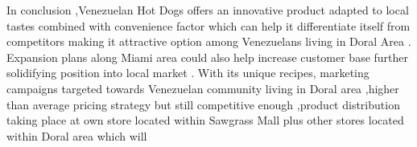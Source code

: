 In conclusion ,Venezuelan Hot Dogs offers an innovative product adapted to local tastes combined with convenience factor which can help it differentiate itself from competitors making it attractive option among Venezuelans living in Doral Area . Expansion plans along Miami area could also help increase customer base further solidifying position into local market . With its unique recipes, marketing campaigns targeted towards Venezuelan community living in Doral area ,higher than average pricing strategy but still competitive enough ,product distribution taking place at own store located within Sawgrass Mall plus other stores located within Doral area which will